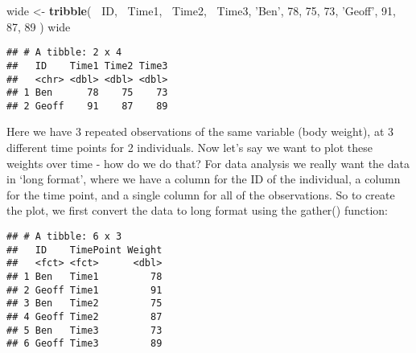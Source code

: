 \documentclass[
]{article}
\newenvironment{Shaded}{\begin{snugshade}}{\end{snugshade}}
\newcommand{\DataTypeTok}[1]{\textcolor[rgb]{0.13,0.29,0.53}{#1}}
\newcommand{\DecValTok}[1]{\textcolor[rgb]{0.00,0.00,0.81}{#1}}
\newcommand{\KeywordTok}[1]{\textcolor[rgb]{0.13,0.29,0.53}{\textbf{#1}}}
\newcommand{\NormalTok}[1]{#1}
\newcommand{\OperatorTok}[1]{\textcolor[rgb]{0.81,0.36,0.00}{\textbf{#1}}}
\newcommand{\StringTok}[1]{\textcolor[rgb]{0.31,0.60,0.02}{#1}}
\begin{document}
\begin{Shaded}
\begin{Highlighting}[]
\NormalTok{wide <-}\StringTok{ }\KeywordTok{tribble}\NormalTok{(}
        \OperatorTok{~}\NormalTok{ID, }\OperatorTok{~}\NormalTok{Time1, }\OperatorTok{~}\NormalTok{Time2, }\OperatorTok{~}\NormalTok{Time3,}
        \StringTok{'Ben'}\NormalTok{, }\DecValTok{78}\NormalTok{, }\DecValTok{75}\NormalTok{, }\DecValTok{73}\NormalTok{,}
        \StringTok{'Geoff'}\NormalTok{, }\DecValTok{91}\NormalTok{, }\DecValTok{87}\NormalTok{, }\DecValTok{89}
\NormalTok{    )}
\NormalTok{wide}
\end{Highlighting}
\end{Shaded}

\begin{verbatim}
## # A tibble: 2 x 4
##   ID    Time1 Time2 Time3
##   <chr> <dbl> <dbl> <dbl>
## 1 Ben      78    75    73
## 2 Geoff    91    87    89
\end{verbatim}

Here we have 3 repeated observations of the same variable (body weight),
at 3 different time points for 2 individuals. Now let's say we want to
plot these weights over time - how do we do that? For data analysis we
really want the data in `long format', where we have a column for the ID
of the individual, a column for the time point, and a single column for
all of the observations. So to create the plot, we first convert the
data to long format using the gather() function:

\begin{Shaded}
\end{Shaded}

\begin{verbatim}
## # A tibble: 6 x 3
##   ID    TimePoint Weight
##   <fct> <fct>      <dbl>
## 1 Ben   Time1         78
## 2 Geoff Time1         91
## 3 Ben   Time2         75
## 4 Geoff Time2         87
## 5 Ben   Time3         73
## 6 Geoff Time3         89
\end{verbatim}
\end{document}
